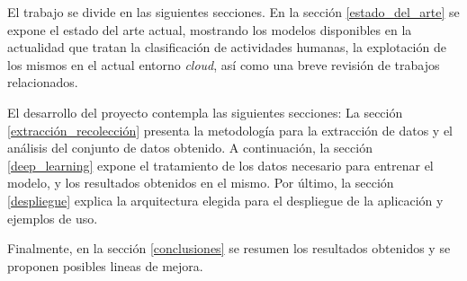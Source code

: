 El trabajo se divide en las siguientes secciones. En la sección \ref{estado_del_arte} se expone el estado del arte actual, mostrando los modelos disponibles en la actualidad que tratan la clasificación de actividades humanas, la explotación de los mismos en el actual entorno \textit{cloud}, así como una breve revisión de trabajos relacionados.

El desarrollo del proyecto contempla las siguientes secciones: La sección \ref{extracción_recolección} presenta la metodología para la extracción de datos y el análisis del conjunto de datos obtenido. A continuación, la sección \ref{deep_learning} expone el tratamiento de los datos necesario para entrenar el modelo, y los resultados obtenidos en el mismo. Por último, la sección \ref{despliegue} explica la arquitectura elegida para el despliegue de la aplicación y ejemplos de uso.

Finalmente, en la sección \ref{conclusiones} se resumen los resultados obtenidos y se proponen posibles lineas de mejora.
